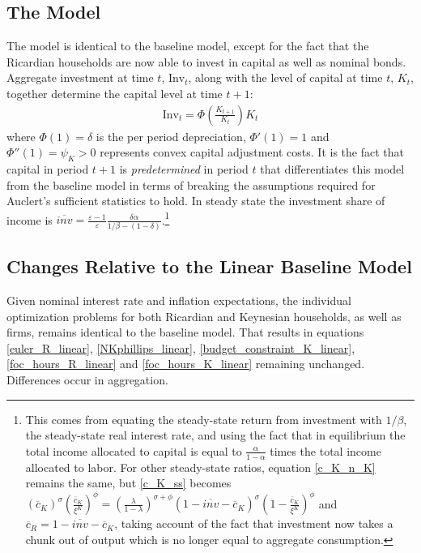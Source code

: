 \documentclass[titlepage]{\econtex}\newcommand{\texname}{ConsumptionHeterogeneity}
\begin{document}
\subsection{The Model}
The model is identical to the baseline model, except for the fact that the Ricardian households are now able to invest in capital as well as nominal bonds. Aggregate investment at time $t$, $\text{Inv}_t$, along with the level of capital at time $t$, $K_t$, together determine the capital level at time $t+1$:
\begin{align}
\text{Inv}_t = \Phi\left(\frac{K_{t+1}}{K_t}\right) K_t
\end{align}
where $\Phi(1) =\delta$ is the per period depreciation, $\Phi'(1) =1$ and $\Phi''(1) =\psi_K >0 $ represents convex capital adjustment costs. It is the fact that capital in period $t+1$ is \textit{predetermined} in period $t$ that differentiates this model from the baseline model in terms of breaking the assumptions required for Auclert's sufficient statistics to hold. In steady state the investment share of income is $\overline{\textit{inv}} = \frac{\varepsilon-1}{\varepsilon} \frac{\delta \alpha}{1/\beta - (1-\delta)}$.\footnote{This comes from equating the steady-state return from investment with $1/\beta$, the steady-state real interest rate, and using the fact that in equilibrium the total income allocated to capital is equal to $\frac{\alpha}{1-\alpha}$ times the total income allocated to labor. For other steady-state ratios, equation \ref{c_K_n_K} remains the same, but \ref{c_K_ss} becomes $(\overline{c}_{K})^\sigma  \left(\frac{\overline{c}_{K}}{\xi^K}\right)^\phi = \left(\frac{\lambda}{1-\lambda}\right)^{\sigma+\phi}(1-\overline{\textit{inv}}-\overline{c}_{K})^\sigma  (1-\frac{\overline{c}_{K}}{\xi^K})^\phi$ and $\overline{c}_{R}=1-\overline{\textit{inv}}-\overline{c}_{K}$, taking account of the fact that investment now takes a chunk out of output which is no longer equal to aggregate consumption.}

\subsection{Changes Relative to the Linear Baseline Model}
Given nominal interest rate and inflation expectations, the individual optimization problems for both Ricardian and Keynesian households, as well as firms, remains identical to the baseline model. That results in equations \ref{euler_R_linear}, \ref{NKphillips_linear}, \ref{budget_constraint_K_linear}, \ref{foc_hours_R_linear} and \ref{foc_hours_K_linear} remaining unchanged. Differences occur in aggregation.
\end{document}
